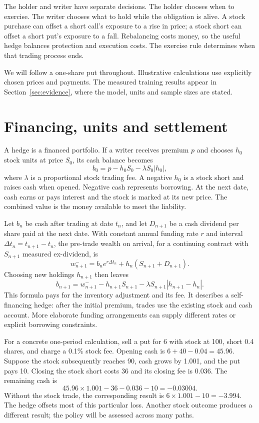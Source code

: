 \documentclass[8pt]{strategynet-journal}
\begin{document}
\begin{SNcolumns}
The holder and writer have separate decisions. The holder chooses when to
exercise. The writer chooses what to hold while the obligation is alive.
A stock purchase can offset a short call's exposure to a rise in price; a
stock short can offset a short put's exposure to a fall. Rebalancing costs
money, so the useful hedge balances protection and execution costs. The
exercise rule determines when that trading process ends.

We will follow a one-share put throughout. Illustrative calculations use
explicitly chosen prices and payments. The measured training results appear
in Section~\ref{sec:evidence}, where the model, units and sample sizes are stated.

\section{Financing, units and settlement}
A hedge is a financed portfolio. If a writer receives premium $p$ and chooses
$h_0$ stock units at price $S_0$, its cash balance becomes
\[
 b_0=p-h_0S_0-\lambda S_0|h_0|,
\]
where $\lambda$ is a proportional stock trading fee. A negative $h_0$ is a
stock short and raises cash when opened. Negative cash represents borrowing.
At the next date, cash earns or pays interest and the stock is marked at its
new price. The combined value is the money available to meet the liability.

Let $b_n$ be cash after trading at date $t_n$, and let $D_{n+1}$ be a cash
dividend per share paid at the next date. With constant annual funding rate
$r$ and interval $\Delta t_n=t_{n+1}-t_n$, the pre-trade wealth on arrival, for a continuing contract with $S_{n+1}$
measured ex-dividend, is
\[
 w_{n+1}^{-}=b_ne^{r\Delta t_n}+h_n(S_{n+1}+D_{n+1}).
\]
Choosing new holdings $h_{n+1}$ then leaves
\[
 b_{n+1}=w_{n+1}^{-}-h_{n+1}S_{n+1}
             -\lambda S_{n+1}|h_{n+1}-h_n|.
\]
This formula pays for the inventory adjustment and its fee. It describes a
self-financing hedge: after the initial premium, trades use the existing
stock and cash account. More elaborate funding arrangements can supply
different rates or explicit borrowing constraints.

For a concrete one-period calculation, sell a put for 6 with stock at 100,
short 0.4 shares, and charge a 0.1\% stock fee. Opening cash is
$6+40-0.04=45.96$. Suppose the stock subsequently reaches 90, cash grows by
1.001, and the put pays 10. Closing the stock short costs 36 and its closing
fee is 0.036. The remaining cash is
\[
 45.96\times1.001-36-0.036-10=-0.03004.
\]
Without the stock trade, the corresponding result is $6\times1.001-10=-3.994$.
The hedge offsets most of this particular loss. Another stock outcome produces
a different result; the policy will be assessed across many paths.


\end{SNcolumns}
\end{document}

